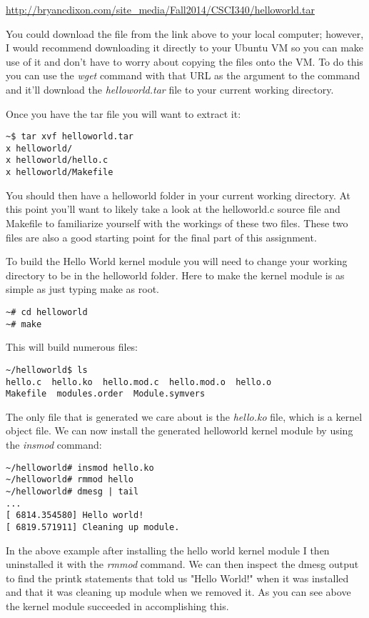 \documentclass[11pt]{article}
\begin{document}
{\url{http://bryancdixon.com/site_media/Fall2014/CSCI340/helloworld.tar}}

You could download the file from the link above to your local computer; however, I would recommend downloading it directly to your Ubuntu VM so you can make use of it and don't have to worry about copying the files onto the VM. To do this you can use the {\it wget} command with that URL as the argument to the command and it'll download the {\it helloworld.tar} file to your current working directory.

Once you have the tar file you will want to extract it:

\begin{verbatim}
~$ tar xvf helloworld.tar
x helloworld/
x helloworld/hello.c
x helloworld/Makefile
\end{verbatim}

You should then have a helloworld folder in your current working directory. At this point you'll want to likely take a look at the helloworld.c source file and Makefile to familiarize yourself with the workings of these two files. These two files are also a good starting point for the final part of this assignment. 

To build the Hello World kernel module you will need to change your working directory to be in the helloworld folder. Here to make the kernel module is as simple as just typing make as root.

\begin{verbatim}
~# cd helloworld
~# make
\end{verbatim}

\newpage

This will build numerous files:

\begin{verbatim}
~/helloworld$ ls
hello.c  hello.ko  hello.mod.c  hello.mod.o  hello.o  
Makefile  modules.order  Module.symvers
\end{verbatim}

The only file that is generated we care about is the {\it hello.ko} file, which is a kernel object file. We can now install the generated helloworld kernel module by using the {\it insmod} command:

\begin{verbatim}
~/helloworld# insmod hello.ko
~/helloworld# rmmod hello
~/helloworld# dmesg | tail
...
[ 6814.354580] Hello world!
[ 6819.571911] Cleaning up module.
\end{verbatim}

In the above example after installing the hello world kernel module I then uninstalled it with the {\it rmmod} command. We can then inspect the dmesg output to find the printk statements that told us "Hello World!" when it was installed and that it was cleaning up module when we removed it. As you can see above the kernel module succeeded in accomplishing this.
\end{document}
